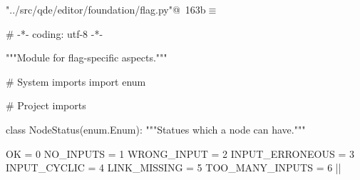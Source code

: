 \documentclass[%
    a4paper,    %
    justified,  %
    nobib,      %
    openany     %
]{tufte-book}
\begin{document}
\begin{flushleft} \small
\begin{minipage}{\linewidth}\label{scrap190}\raggedright\small
{} \verb@"../src/qde/editor/foundation/flag.py"@\nobreak\ {\footnotesize {163b}}$\equiv$
\vspace{-1ex}
\begin{pythoncode}
# -*- coding: utf-8 -*-

"""Module for flag-specific aspects."""

# System imports
import enum

# Project imports


class NodeStatus(enum.Enum):
    """Statues which a node can have."""

    OK              = 0
    NO_INPUTS       = 1
    WRONG_INPUT     = 2
    INPUT_ERRONEOUS = 3
    INPUT_CYCLIC    = 4
    LINK_MISSING    = 5
    TOO_MANY_INPUTS = 6
|\NWsep|
\end{pythoncode}
\vspace{1.5ex}
\footnotesize
\begin{list}{}{\setlength{\itemsep}{-\parsep}\setlength{\itemindent}{-\leftmargin}}

\item{}
\end{list}
\end{minipage}\vspace{4ex}
\end{flushleft}
\end{document}
